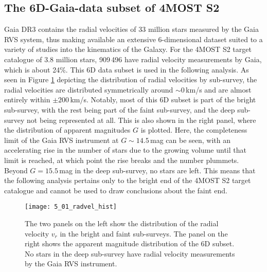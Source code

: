 \documentclass[a4paper,11pt]{article}
\begin{document}
\subsection{The 6D-Gaia-data subset of 4MOST S2}\label{6d_subset}
Gaia DR3 contains the radial velocities of 33 million stars measured by the Gaia RVS system, thus making available an extensive 6-dimensional dataset suited to a variety of studies into the kinematics of the Galaxy. For the 4MOST S2 target catalogue of 3.8 million stars, 909\,496 have radial velocity measurements by Gaia, which is about 24\%. This 6D data subset is used in the following analysis. As seen in Figure \ref{fig:radvel_hist} depicting the distribution of radial velocities by sub-survey, the radial velocities are distributed symmetrically around ${\sim}0$\,km/s and are almost entirely within $\pm200$\,km/s. Notably, most of this 6D subset is part of the bright sub-survey, with the rest being part of the faint sub-survey, and the deep sub-survey not being represented at all. This is also shown in the right panel, where the distribution of apparent magnitudes $G$ is plotted. Here, the completeness limit of the Gaia RVS instrument at $G\sim14.5$\,mag can be seen, with an accelerating rise in the number of stars due to the growing volume until that limit is reached, at which point the rise breaks and the number plummets. Beyond $G=15.5$\,mag in the deep sub-survey, no stars are left. This means that the following analysis pertains only to the bright end of the 4MOST S2 target catalogue and cannot be used to draw conclusions about the faint end.
%
\begin{figure}[h]
 \centering
 \texttt{[image: 5\_01\_radvel\_hist]}
 \caption[Histograms of radial velocities and distribution in $G$]{The two panels on the left show the distribution of the radial velocity $v_r$ in the bright and faint sub-surveys. The panel on the right shows the apparent magnitude distribution of the 6D subset. No stars in the deep sub-survey have radial velocity measurements by the Gaia RVS instrument.}
 \label{fig:radvel_hist}
\end{figure}\\
%
\end{document}

